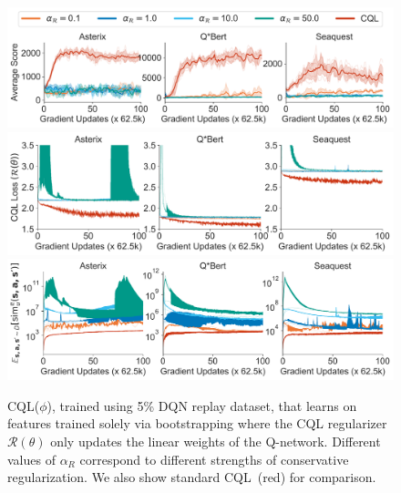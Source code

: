 
\begin{figure}
    \centering
    \includegraphics[width=\linewidth]{chapters/dr3/atari/cql_on_bootstrapping_feat.pdf}
    \includegraphics[width=\linewidth]{chapters/dr3/atari/cql_losses_bootstrapped_feat.pdf}
    \includegraphics[width=\linewidth]{chapters/dr3/atari/sim_s_ns_cql_on_bootstrapping_feat.pdf}
    \vspace{-0.65cm}
    \caption{\small{CQL($\phi$), trained using 5\% DQN replay dataset, that learns on features trained solely via bootstrapping where the CQL regularizer $\mathcal{R}(\theta)$ only updates the linear weights of the Q-network. Different values of $\alpha_R$ correspond to different strengths of conservative regularization. We also show standard CQL~(red) for comparison.}} 
    \label{fig:atari_3_games_cql_bootstrap}
    \vspace{-0.6cm}
\end{figure}
